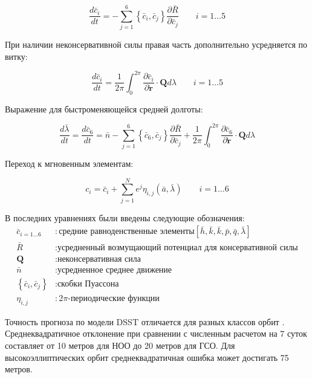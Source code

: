 \begin{equation*}
    \frac{d\bar{c}_i}{dt} = -\sum_{j=1}^{6} \left\{\bar{c}_i, \bar{c}_j \right\} 
                                \frac{\partial \bar{R}}{\partial\bar{c}_j} \qquad i=1 \dots 5
\end{equation*}

При наличии неконсервативной силы правая часть дополнительно усредняется по витку:

\begin{equation*}
    \frac{d\bar{c}_i}{dt} = \frac{1}{2 \pi} \int_{0}^{2 \pi} \frac{\partial\bar{c}_i}{\partial\dot{\mathbf{r}}} 
                        \cdot \mathbf{Q} d\lambda \qquad i=1 \dots 5
\end{equation*}

Выражение для быстроменяющейся средней долготы:

\begin{equation*}
    \frac{d \bar{\lambda}}{dt} = \frac{d\bar{c}_6}{dt} = 
        \bar{n} -\sum_{j=1}^{6} \left\{\bar{c}_6, \bar{c}_j \right\} 
                                \frac{\partial \bar{R}}{\partial\bar{c}_j}
                +\frac{1}{2 \pi} \int_{0}^{2 \pi} \frac{\partial\bar{c}_6}{\partial\dot{\mathbf{r}}} 
                        \cdot \mathbf{Q} d\lambda
\end{equation*}

Переход к мгновенным элементам:

\begin{equation*}
    c_i = \bar{c}_i + \sum_{j=1}^{N} e^j \eta_{i, j}\left(\bar{a}, \bar{\lambda}\right) \qquad i = 1 \dots 6
\end{equation*}

В последних уравнениях были введены следующие обозначения:
\begin{align*}
    \bar{c}_{i=1 \dots 6} &: \text{средние равноденственные элементы} \left[\bar{h}, \bar{k}, \bar{k}, \bar{p}, \bar{q}, \bar{\lambda}\right] \\
    \bar{R} &: \text{усредненный возмущающий потенциал для консервативной силы} \\
    \mathbf{Q} &: \text{неконсервативная сила} \\
    \bar{n} &: \text{усредненное среднее движение} \\
    \left\{\bar{c}_i, \bar{c}_j \right\} &: \text{скобки Пуассона} \\
    \eta_{i, j} &: 2\pi \text{-периодические функции}
\end{align*}

Точность прогноза по модели DSST отличается для разных классов орбит \cite{setty2016}.
Среднеквадратичное отклонение при сравнении с численным расчетом на 7 суток составляет от 10 метров для НОО до 20 метров для ГСО.
Для высокоэллиптических орбит среднеквадратичная ошибка может достигать 75 метров. 


